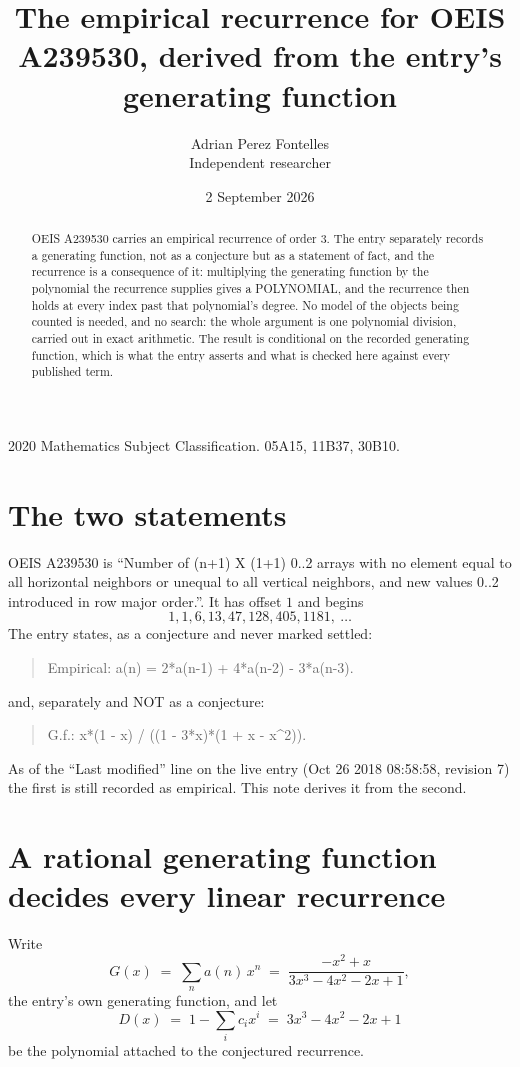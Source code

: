 \documentclass[11pt,a4paper]{article}
\title{The empirical recurrence for OEIS A239530, derived from the entry's generating function}
\author{Adrian Perez Fontelles\\ \small Independent researcher}
\date{2 September 2026}
\theoremstyle{plain}
\theoremstyle{definition}
\begin{document}
\maketitle

\begin{abstract}
OEIS A239530 carries an empirical recurrence of order $3$. The entry separately records a
generating function, not as a conjecture but as a statement of fact, and the recurrence is a
consequence of it: multiplying the generating function by the polynomial the recurrence
supplies gives a POLYNOMIAL, and the recurrence then holds at every index past that
polynomial's degree. No model of the objects being counted is needed, and no search: the
whole argument is one polynomial division, carried out in exact arithmetic. The result is
conditional on the recorded generating function, which is what the entry asserts and what is
checked here against every published term.
\end{abstract}

\noindent\small 2020 Mathematics Subject Classification. 05A15, 11B37, 30B10.\normalsize

\section{The two statements}

OEIS A239530 is ``Number of (n+1) X (1+1) 0..2 arrays with no element equal to all horizontal neighbors or unequal to all vertical neighbors, and new values 0..2 introduced in row major order.''. It has offset $1$ and begins
\[
1, 1, 6, 13, 47, 128, 405, 1181,\ \dots
\]
The entry states, as a conjecture and never marked settled:
\begin{quote}
Empirical: a(n) = 2*a(n-1) + 4*a(n-2) - 3*a(n-3).
\end{quote}
and, separately and NOT as a conjecture:
\begin{quote}
G.f.: x*(1 - x) / ((1 - 3*x)*(1 + x - x\^{}2)).
\end{quote}
As of the ``Last modified'' line on the live entry (Oct 26 2018 08:58:58, revision 7) the first is still
recorded as empirical. This note derives it from the second.

\section{A rational generating function decides every linear recurrence}

Write
\[
G(x)\;=\;\sum_{n}a(n)\,x^{n}\;=\;\frac{- x^{2} + x}{3 x^{3} - 4 x^{2} - 2 x + 1},
\]
the entry's own generating function, and let
\[
D(x)\;=\;1-\sum_i c_i x^{i}\;=\;3 x^{3} - 4 x^{2} - 2 x + 1
\]
be the polynomial attached to the conjectured recurrence.
\end{document}
